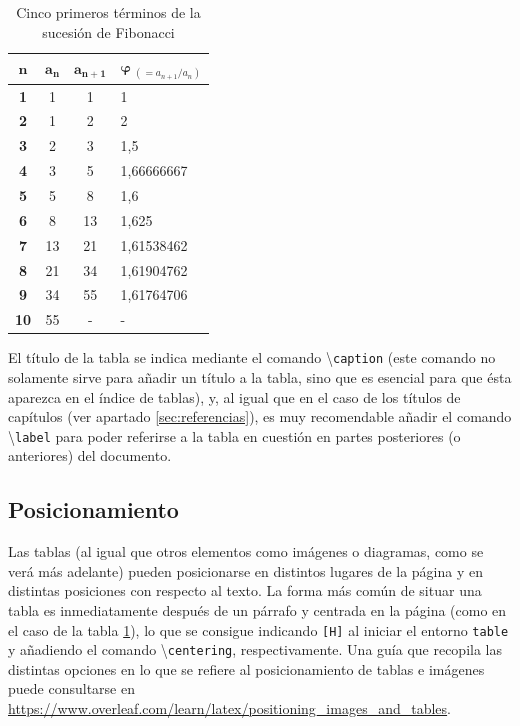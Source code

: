\vspace{25pt}

\begin{table}[H]
\centering
\begin{tabular}{|c|c|c|l|}
\hline
$\bm{n}$ & $\bm{a_n}$ & $\bm{a_{n+1}}$ & $\bm{\varphi} \ _{(= a_{n+1}/a_n)}$ \\ \hline\hline
\textbf{1} & 1 & 1 & 1 \\ \hline
\textbf{2} & 1 & 2 & 2 \\ \hline
\textbf{3} & 2 & 3 & 1,5 \\ \hline
\textbf{4} & 3 & 5 & 1,66666667 \\ \hline
\textbf{5} & 5 & 8 & 1,6 \\ \hline
\textbf{6} & 8 & 13 & 1,625 \\ \hline
\textbf{7} & 13 & 21 & 1,61538462 \\ \hline
\textbf{8} & 21 & 34 & 1,61904762 \\ \hline
\textbf{9} & 34 & 55 & 1,61764706 \\ \hline
\textbf{10} & 55 & - & - \\ \hline
\end{tabular}
\caption{Cinco primeros términos de la sucesión de Fibonacci}
\label{tabla:fibonacci5}
\end{table}

\vspace{5pt}

El título de la tabla se indica mediante el comando \textbackslash\texttt{caption} (este comando no solamente sirve para añadir un título a la tabla, sino que es esencial para que ésta aparezca en el índice de tablas), y, al igual que en el caso de los títulos de capítulos (ver apartado \ref{sec:referencias}), es muy recomendable añadir el comando \textbackslash\texttt{label} para poder referirse a la tabla en cuestión en partes posteriores (o anteriores) del documento.


\subsection{Posicionamiento}

Las tablas (al igual que otros elementos como imágenes o diagramas, como se verá más adelante) pueden posicionarse en distintos lugares de la página y en distintas posiciones con respecto al texto. La forma más común de situar una tabla es inmediatamente después de un párrafo y centrada en la página (como en el caso de la tabla \ref{tabla:fibonacci5}), lo que se consigue indicando \texttt{[H]} al iniciar el entorno \texttt{table} y añadiendo el comando \textbackslash\texttt{centering}, respectivamente. Una guía que recopila las distintas opciones en lo que se refiere al posicionamiento de tablas e imágenes puede consultarse en \url{https://www.overleaf.com/learn/latex/positioning_images_and_tables}.


